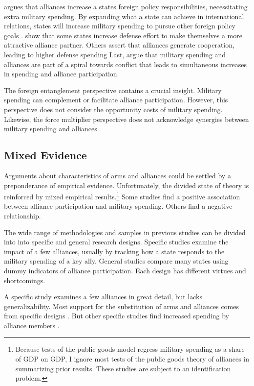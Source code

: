 \documentclass[12pt]{article}
\begin{document}
\citet{Diehl1994} argues that alliances increase a states foreign policy responsibilities, necessitating extra military spending. 
By expanding what a state can achieve in international relations, states will increase military spending to pursue other foreign policy goals \citep{MorganPalmer2006}. 
\citet{Horowitzetal2017} show that some states increase defense effort to make themselves a more attractive alliance partner. 
Others assert that alliances generate cooperation, leading to higher defense spending \citep{Palmer1990, QuirozFlores2011}
Last, \citet{SeneseVasquez2008} argue that military spending and alliances are part of a spiral towards conflict that leads to simultaneous increases in spending and alliance participation. 


The foreign entanglement perspective contains a crucial insight.
Military spending can complement or facilitate alliance participation. 
However, this perspective does not consider the opportunity costs of military spending. 
Likewise, the force multiplier perspective does not acknowledge synergies between military spending and alliances. 


\subsection{Mixed Evidence} 


Arguments about characteristics of arms and alliances could be settled by a preponderance of empirical evidence. 
Unfortunately, the divided state of theory is reinforced by mixed empirical results.\footnote{Because tests of the public goods model regress military spending as a share of GDP on GDP, I ignore most tests of the public goods theory of alliances in summarizing prior results. These studies are subject to an identification problem.}
Some studies find a positive association between alliance participation and military spending. 
Others find a negative relationship. 


The wide range of methodologies and samples in previous studies can be divided into into specific and general research designs.  
Specific studies examine the impact of a few alliances, usually by tracking how a state responds to the military spending of a key ally. 
General studies compare many states using dummy indicators of alliance participation. 
Each design has different virtues and shortcomings. 


A specific study examines a few alliances in great detail, but lacks generalizability. 
Most support for the substitution of arms and alliances comes from specific designs \citep{BarnettLevy1991, Morrow1993, Sorokin1994, PluemperNeumayer2015}. 
But other specific studies find increased spending by alliance members \citep{ConybeareSandler1990, Chenetal1996}. 
\end{document}
